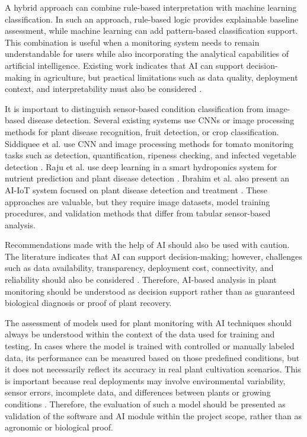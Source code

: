 A hybrid approach can combine rule-based interpretation with machine learning classification. In such an approach, rule-based logic provides explainable baseline assessment, while machine learning can add pattern-based classification support. This combination is useful when a monitoring system needs to remain understandable for users while also incorporating the analytical capabilities of artificial intelligence. Existing work indicates that AI can support decision-making in agriculture, but practical limitations such as data quality, deployment context, and interpretability must also be considered \cite{mansoor2025integration,miller2025iot,nawaz2025iot}.

It is important to distinguish sensor-based condition classification from image-based disease detection. Several existing systems use CNNs or image processing methods for plant disease recognition, fruit detection, or crop classification. Siddiquee et al. use CNN and image processing methods for tomato monitoring tasks such as detection, quantification, ripeness checking, and infected vegetable detection \cite{siddiquee2022algorithms}. Raju et al. use deep learning in a smart hydroponics system for nutrient prediction and plant disease detection \cite{raju2022hydroponics}. Ibrahim et al. also present an AI-IoT system focused on plant disease detection and treatment \cite{ibrahim2025pivot}. These approaches are valuable, but they require image datasets, model training procedures, and validation methods that differ from tabular sensor-based analysis.

Recommendations made with the help of AI should also be used with caution. The literature indicates that AI can support decision-making; however, challenges such as data availability, transparency, deployment cost, connectivity, and reliability should also be considered \cite{miller2025iot,nawaz2025iot}. Therefore, AI-based analysis in plant monitoring should be understood as decision support rather than as guaranteed biological diagnosis or proof of plant recovery.

The assessment of models used for plant monitoring with AI techniques should always be understood within the context of the data used for training and testing. In cases where the model is trained with controlled or manually labeled data, its performance can be measured based on those predefined conditions, but it does not necessarily reflect its accuracy in real plant cultivation scenarios. This is important because real deployments may involve environmental variability, sensor errors, incomplete data, and differences between plants or growing conditions \cite{miller2025iot,nawaz2025iot}. Therefore, the evaluation of such a model should be presented as validation of the software and AI module within the project scope, rather than as agronomic or biological proof.

